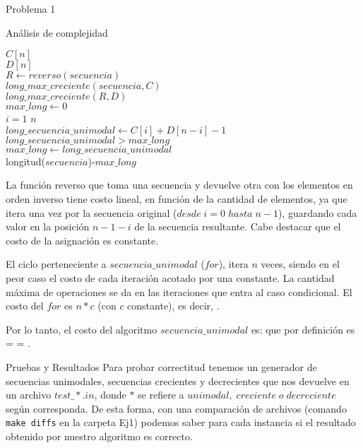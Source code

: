 \begin{section}{Problema 1}
\begin{subsection}{Análisis de complejidad}
		\vspace{0.5cm}
		\begin{pseudo}
			\tab $C[n]$\\
			\tab $D[n]$\\
			\tab $R \leftarrow reverso(secuencia)$ 		 \\
			\tab $long\_max\_creciente(secuencia,C)$ 	\\
			\tab $long\_max\_creciente(R,D)$		\\
			\tab $max\_long \leftarrow 0$			\\
			\tab \FOR $i=1$ \TO $n$				\\
			\tab \tab $long\_secuencia\_unimodal\leftarrow C[i]+D[n-i]-1$ 	\\
			\tab \tab \IF $ long\_secuencia\_unimodal >  max\_long$ 	\\
			\tab \tab \tab $max\_long \leftarrow long\_secuencia\_unimodal$ \\
			\tab \RET longitud($secuencia$)-$max\_long$ 			\\
		\end{pseudo}
		
		La función reverso que toma una secuencia y devuelve otra con los elementos en orden inverso tiene costo lineal, en función 
		de la cantidad de elementos, ya que itera una vez por la secuencia original ($desde\; i=0\; hasta\; n-1$), guardando cada valor en 
		la posición $n-1-i$ de la secuencia resultante. Cabe destacar que el costo de la asignación es constante.

		El ciclo perteneciente a $secuencia\_unimodal$ ($for$), itera $n$ veces, siendo en el peor caso el costo de cada iteración acotado por una
		constante. La cantidad máxima de operaciones se da en las iteraciones que entra al caso condicional. El costo del $for$ es $n*c$ (con $c$ constante), es decir, .

		Por lo tanto, el costo del algoritmo $secuencia\_unimodal$ es:  que por definición es 
		 =  = .
		
	\end{subsection}


	\begin{subsection}{Pruebas y Resultados}
		Para probar correctitud tenemos un generador de secuencias unimodales, secuencias crecientes y decrecientes que nos devuelve en un archivo $test\_*.in$, donde $*$ se refiere a $unimodal,\; creciente\; o\; decreciente$ según corresponda. De esta forma, con una comparación de archivos (comando \texttt{make diffs} en la carpeta Ej1) podemos saber para cada instancia si el resultado obtenido por nuestro algoritmo es correcto.


\end{subsection}
\end{section}

